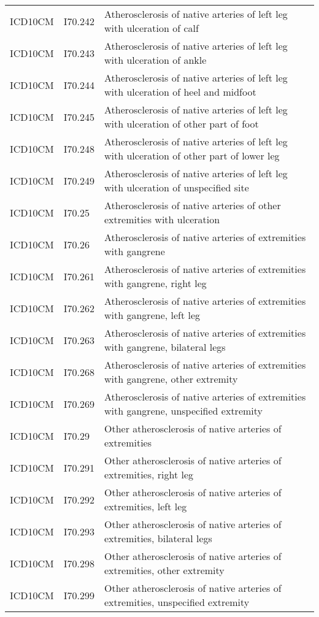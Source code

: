 \begin{longtable}{p{}p{}p{}}
  ICD10CM & I70.242 & Atherosclerosis of native arteries of left leg with ulceration of calf \\ 
  ICD10CM & I70.243 & Atherosclerosis of native arteries of left leg with ulceration of ankle \\ 
  ICD10CM & I70.244 & Atherosclerosis of native arteries of left leg with ulceration of heel and midfoot \\ 
  ICD10CM & I70.245 & Atherosclerosis of native arteries of left leg with ulceration of other part of foot \\ 
  ICD10CM & I70.248 & Atherosclerosis of native arteries of left leg with ulceration of other part of lower leg \\ 
  ICD10CM & I70.249 & Atherosclerosis of native arteries of left leg with ulceration of unspecified site \\ 
  ICD10CM & I70.25 & Atherosclerosis of native arteries of other extremities with ulceration \\ 
  ICD10CM & I70.26 & Atherosclerosis of native arteries of extremities with gangrene \\ 
  ICD10CM & I70.261 & Atherosclerosis of native arteries of extremities with gangrene, right leg \\ 
  ICD10CM & I70.262 & Atherosclerosis of native arteries of extremities with gangrene, left leg \\ 
  ICD10CM & I70.263 & Atherosclerosis of native arteries of extremities with gangrene, bilateral legs \\ 
  ICD10CM & I70.268 & Atherosclerosis of native arteries of extremities with gangrene, other extremity \\ 
  ICD10CM & I70.269 & Atherosclerosis of native arteries of extremities with gangrene, unspecified extremity \\ 
  ICD10CM & I70.29 & Other atherosclerosis of native arteries of extremities \\ 
  ICD10CM & I70.291 & Other atherosclerosis of native arteries of extremities, right leg \\ 
  ICD10CM & I70.292 & Other atherosclerosis of native arteries of extremities, left leg \\ 
  ICD10CM & I70.293 & Other atherosclerosis of native arteries of extremities, bilateral legs \\ 
  ICD10CM & I70.298 & Other atherosclerosis of native arteries of extremities, other extremity \\ 
  ICD10CM & I70.299 & Other atherosclerosis of native arteries of extremities, unspecified extremity \\ 

\end{longtable}
